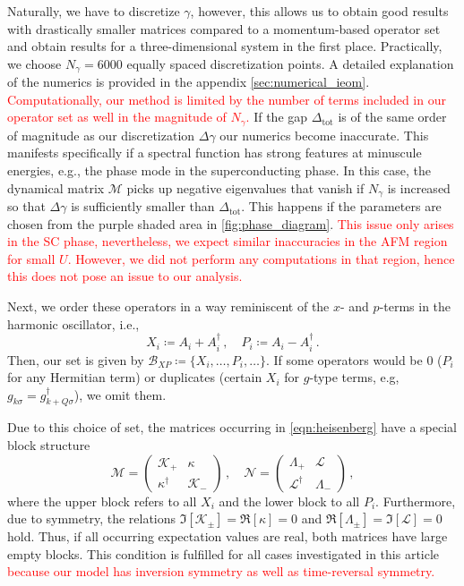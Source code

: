 \documentclass[
    reprint, 
    aps,
    preprintnumbers,
    twocolumn,
    prb,
    superscriptaddress
]{revtex4-2}
\newcommand{\mM}{\mathcal{M}}
\newcommand{\mN}{\mathcal{N}}
\begin{document}
Naturally, we have to discretize $\gamma$, 
however, this allows us to obtain good results with drastically smaller matrices compared to a momentum-based operator set and obtain results for a three-dimensional system in the first place.
Practically, we choose $N_\gamma = 6000$ equally spaced discretization points.
A detailed explanation of the numerics is provided in the appendix \ref{sec:numerical_ieom}.
\textcolor{red}{Computationally, our method is limited by the number of terms included in our operator set as well in the magnitude of $N_\gamma$.}
If the gap $\Delta_\text{tot}$ is of the same order of magnitude as our discretization $\Delta \gamma$ our numerics become inaccurate.
This manifests specifically if a spectral function has strong features at minuscule energies, e.g., the phase mode in the superconducting phase.
In this case, the dynamical matrix $\mM$ picks up negative eigenvalues that vanish if $N_\gamma$ is increased so that $\Delta \gamma$ is sufficiently smaller than $\Delta_\text{tot}$.
This happens if the parameters are chosen from the purple shaded area in \autoref{fig:phase_diagram}.
\textcolor{red}{This issue only arises in the SC phase, nevertheless, we expect similar inaccuracies in the AFM region for small $U$.
However, we did not perform any computations in that region, hence this does not pose an issue to our analysis.}

Next, we order these operators in a way reminiscent of the $x$- and $p$-terms in the harmonic oscillator, i.e.,
\begin{equation}
    X_i \coloneqq  A_i + A_i^\dagger\,,\quad P_i \coloneqq  A_i - A_i^\dagger\,.
\end{equation}
Then, our set is given by $\mathcal{B}_{XP} \coloneqq \{ X_i, \ldots, P_i, \ldots \}$.
If some operators would be 0 ($P_i$ for any Hermitian term) or duplicates (certain $X_i$ for $g$-type terms, e.g, $g_{k\sigma} = g_{k+Q\sigma}^\dagger$), we omit them.

Due to this choice of set, the matrices occurring in \eqref{eqn:heisenberg} have a special block structure
\begin{equation}
    \label{eqn:xp_set}
    \mM = \begin{pmatrix}
        \mathcal{K}_+ & \kappa \\ \kappa^\dagger & \mathcal{K}_-
    \end{pmatrix}\,,\quad \mN = \begin{pmatrix}
        \Lambda_+ & \mathcal{L} \\ \mathcal{L}^\dagger & \Lambda_-
    \end{pmatrix}\,,
\end{equation}
where the upper block refers to all $X_i$ and the lower block to all $P_i$.
Furthermore, due to symmetry, the relations $\Im [\mathcal{K}_\pm] = \Re [\kappa] = 0$ and $\Re [\Lambda_\pm] = \Im [\mathcal{L}] = 0$ hold.
Thus, if all occurring expectation values are real, both matrices have large empty blocks.
This condition is fulfilled for all cases investigated in this article \textcolor{red}{because our model has inversion symmetry as well as time-reversal symmetry.}
\end{document}
